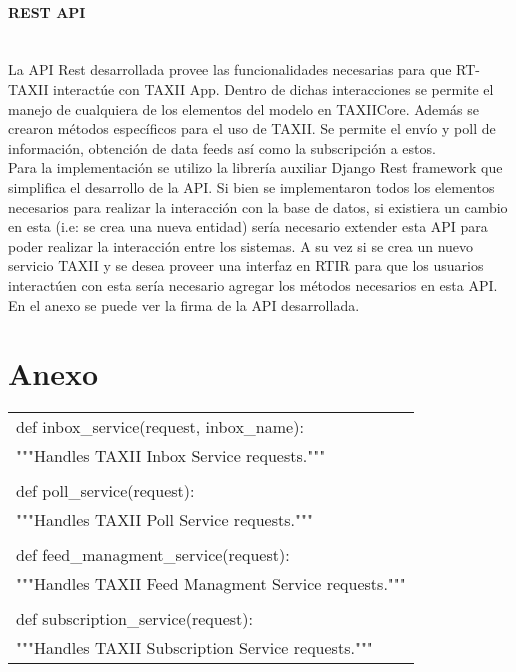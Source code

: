 \documentclass[11pt]{article}
\begin{document}
\paragraph{REST API}\ \\
La API Rest desarrollada provee las funcionalidades necesarias para que RT-TAXII interactúe con TAXII App. Dentro de dichas interacciones se permite el manejo de cualquiera de los elementos del modelo en TAXIICore. Además se crearon métodos específicos para el uso de TAXII. Se permite el envío y poll de información, obtención de data feeds así como la subscripción a estos.\\

Para la implementación se utilizo la librería auxiliar Django Rest framework que simplifica el desarrollo de la API.
Si bien se implementaron todos los elementos necesarios para realizar la interacción con la base de datos, si existiera un cambio en esta (i.e: se crea una nueva entidad) sería necesario extender esta API para poder realizar la interacción entre los sistemas. A su vez si se crea un nuevo servicio TAXII y se desea proveer una interfaz en RTIR para que los usuarios interactúen con esta sería necesario agregar los métodos necesarios en esta API.
En el anexo se puede ver la firma de la API desarrollada.

\section{Anexo}

\begin{center}
	\begin{tabular}{|l|}
		\hline
		def inbox\_service(request, inbox\_name): \\
		"""Handles TAXII Inbox Service requests.""" \\ \\
		
		def poll\_service(request):\ \\
		"""Handles TAXII Poll Service requests.""" \\ \\
		
		def feed\_managment\_service(request): \\
		"""Handles TAXII Feed Managment Service requests.""" \\ \\
		
		def subscription\_service(request):\ \\
		"""Handles TAXII Subscription Service requests.""" \\
		\hline
	\end{tabular}
\end{center}
\end{document}
